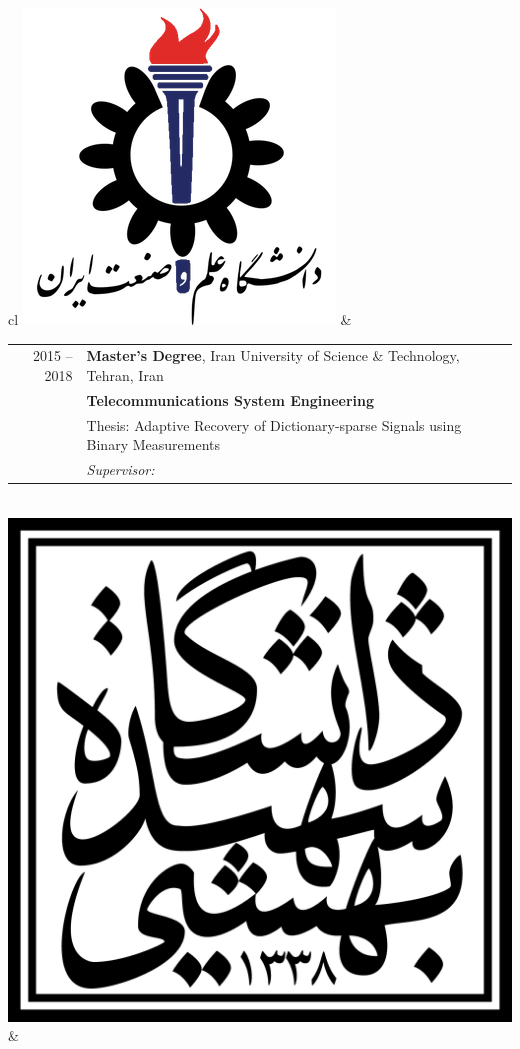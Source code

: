 
\begin{tabular}{cl}
	\includegraphics[scale=0.12]{graphics/IUST_logo_color} & 
	\begin{tabular}{rl}
		\textsc{2015 --2018} & \textbf{Master’s Degree},  Iran University of Science \& Technology,  Tehran, Iran                            \\
		                     & \textbf{Telecommunications System Engineering}                                                                \\
		                     & Thesis: Adaptive Recovery of Dictionary-sparse Signals using Binary Measurements                              \\
		                     & \emph{Supervisor: \link{http://www.iust.ac.ir/content/45110/Dr.-Haddadi}{Assistant Professor Farzan Haddadi}} \\
	\end{tabular}
	\\
	\includegraphics[scale=0.05]{graphics/SBU_logo}        & 

\end{tabular}
